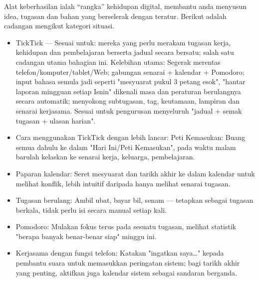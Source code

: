 


Alat keberhasilan ialah “rangka” kehidupan digital, membantu anda menyusun idea, tugasan dan bahan yang berselerak dengan teratur. Berikut adalah cadangan mengikut kategori situasi.


\begin{itemize}
  \item TickTick — Sesuai untuk: mereka yang perlu merakam tugasan kerja, kehidupan dan pembelajaran berserta jadual secara bersatu; salah satu cadangan utama bahagian ini. Kelebihan utama: Segerak merentas telefon/komputer/tablet/Web; gabungan senarai + kalendar + Pomodoro; input bahasa semula jadi seperti "mesyuarat pukul 3 petang esok", "hantar laporan mingguan setiap Isnin" dikenali masa dan peraturan berulangnya secara automatik; menyokong subtugasan, tag, keutamaan, lampiran dan senarai kerjasama. Sesuai untuk pengurusan menyeluruh "jadual + semak tugasan + ulasan harian".
  \item Cara menggunakan TickTick dengan lebih lancar: Peti Kemasukan: Buang semua dahulu ke dalam "Hari Ini/Peti Kemasukan", pada waktu malam barulah kelaskan ke senarai kerja, keluarga, pembelajaran.
  \item Paparan kalendar: Seret mesyuarat dan tarikh akhir ke dalam kalendar untuk melihat konflik, lebih intuitif daripada hanya melihat senarai tugasan.
  \item Tugasan berulang: Ambil ubat, bayar bil, senam — tetapkan sebagai tugasan berkala, tidak perlu isi secara manual setiap kali.
  \item Pomodoro: Mulakan fokus terus pada sesuatu tugasan, melihat statistik "berapa banyak benar-benar siap" minggu ini.
  \item Kerjasama dengan fungsi telefon: Katakan "ingatkan saya…" kepada pembantu suara untuk memasukkan peringatan sistem; bagi tarikh akhir yang penting, aktifkan juga kalendar sistem sebagai sandaran berganda.
\end{itemize}


